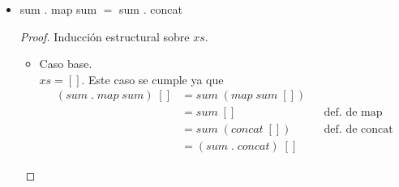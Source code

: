 \documentclass[letterpaper,11pt]{article}
\begin{document}
\begin{enumerate}
\begin{itemize}
\begin{proof}
\begin{itemize}
                \item Paso inductivo.
                \begin{align*}
                    (sum \; . \; map \; double) \; (x:xs)
                    &= sum \; (map \; double \; (x:xs)) \\ 
                    &= sum \; (double \; x \; : \; map \; double \; xs)
                    && \text{def. de map} \\
                    &= double \; x + sum \; (map \; double \; xs)
                    && \text{def. de sum} \\ 
                    &= double \; x + double \; (sum \; xs)
                    && \text{hipótesis de inducción} \\ 
                    &= 2 * x + 2 * (sum \; xs)
                    && \text{def. de double} \\ 
                    &= 2 * (x + sum \; xs)
                    && \text{distributividad} \\ 
                    &= double \; (x + sum \; xs)
                    && \text{def. de double} \\ 
                    &= double \; (sum \; (x:xs))
                    && \text{def. de sum} \\ 
                    &= (double \; . \; sum) \; (x:xs)
                \end{align*}
            \end{itemize}
        \end{proof}

        \newpage
        \item sum . map sum $=$ sum . concat
        \begin{proof}
            Inducción estructural sobre $xs$.
            \begin{itemize}
                \item Caso base. \\ 
                $xs = []$. Este caso se cumple ya que 
                \begin{align*}
                    (sum \; . \; map \; sum) \; [] 
                    &= sum \; (map \; sum \; []) \\
                    &= sum \; []
                    && \text{def. de map} \\
                    &= sum \; (concat \; [])
                    && \text{def. de concat} \\ 
                    &= (sum \; . \; concat) \; []
                \end{align*}


\end{itemize}
\end{proof}
\end{itemize}
\end{enumerate}
\end{document}
